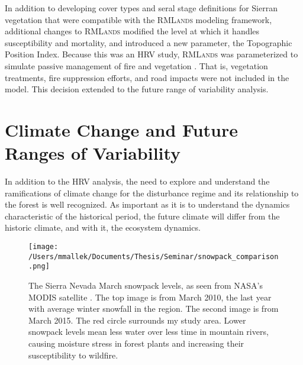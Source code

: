 In addition to developing cover types and seral stage definitions for Sierran vegetation that were compatible with the \textsc{RMLands} modeling framework, additional changes to \textsc{RMLands} modified the level at which it handles susceptibility and mortality, and introduced a new parameter, the Topographic Position Index. Because this was an HRV study, \textsc{RMLands} was parameterized to simulate passive management of fire and vegetation \citep{Wimberly2002,Nonaka2005,McGarigal2012}. That is, vegetation treatments, fire suppression efforts, and road impacts were not included in the model. This decision extended to the future range of variability analysis.










\section{Climate Change and Future Ranges of Variability}

In addition to the HRV analysis, the need to explore and understand the ramifications of climate change for the disturbance regime and its relationship to the forest is well recognized. As important as it is to understand the dynamics characteristic of the historical period, the future climate will differ from the historic climate, and with it, the ecosystem dynamics. 
%
\begin{figure}[!htbp]
\centering
\texttt{[image: /Users/mmallek/Documents/Thesis/Seminar/snowpack\_comparison.png]}
\caption{The Sierra Nevada March snowpack levels, as seen from NASA's MODIS satellite \citep{snowpackphoto}. The top image is from March 2010, the last year with average winter snowfall in the region. The second image is from March 2015. The red circle surrounds my study area. Lower snowpack levels mean less water over less time in mountain rivers, causing moisture stress in forest plants and increasing their susceptibility to wildfire.
}
\label{fig:satellitesnowpack}
\end{figure}

